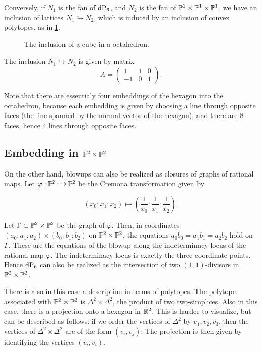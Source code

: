 Conversely, if $N_1$ is the fan of $\dP6$, and $N_2$ is the fan of $\P^1 \times \P^1 \times \P^1$, we have an inclusion of lattices $N_1 \hookrightarrow N_2$, which is induced by an inclusion of convex polytopes, as in \cref{fig:octahedron_hexagon}.

 \begin{figure}
\centering 

\caption{The inclusion of a cube in a octahedron.}
\label{fig:octahedron_hexagon}
\end{figure}

The inclusion $N_1 \hookrightarrow N_2$ is given by matrix
\begin{equation}
\label{eq:A}
A = 
\begin{pmatrix}
1 & 1 & 0 \\
-1 & 0 & 1
\end{pmatrix}.
\end{equation}

Note that there are essentialy four embeddings of the hexagon into the octahedron, because each embedding is given by choosing a line through opposite faces (the line spanned by the normal vector of the hexagon), and there are $8$ faces, hence $4$ lines through opposite faces.

\subsection{Embedding in $\P^2 \times \P^2$}

On the other hand, blowups can also be realized as closures of graphs of rational maps. Let $\varphi: \P^2 \rmap \P^2$ be the Cremona transformation given by

\[
(x_0:x_1:x_2) \mapsto \left( \frac 1{x_0}: \frac 1{x_1}:\frac 1{x_2} \right).
\]

Let $\Gamma \subset \P^2 \times \P^2$ be the graph of $\varphi$. Then, in coordinates ${(a_0:a_1:a_2) \times(b_0:b_1:b_2)}$ on $\P^2 \times \P^2$, the equations $a_0b_0=a_1b_1=a_2b_2$ hold \label{eq:dp6_inp2p2} on $\Gamma$. These are the equations of the blowup along the indeterminacy locus of the rational map $\varphi$. The indeterminacy locus is exactly the three coordinate points. Hence $\dP6$ can also be realized as the intersection of two $(1,1)$-divisors in $\P^2 \times \P^2$. 

There is also in this case a description in terms of polytopes. The polytope associated with $\P^2 \times \P^2$ is $\Delta^2 \times \Delta^2$, the product of two two-simplices. Also in this case, there is a projection onto a hexagon in $\R^2$. This is harder to visualize, but can be described as follows: if we order the vertices of $\Delta^2$ by $v_1,v_2,v_3$, then the vertices of $\Delta^2 \times \Delta^2$ are of the form $(v_i,v_j)$. The projection is then given by identifying the vertices $(v_i,v_i)$. 

